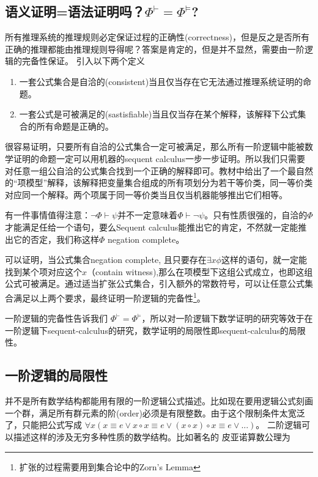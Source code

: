 \subsection{语义证明=语法证明吗？$\Phi^{\vdash}=\Phi^{\models}$?}
    所有推理系统的推理规则必定保证过程的正确性(correctness)，但是反之是否所有正确的推理都能由推理规则导得呢？答案是肯定的，但是并不显然，需要由一阶逻辑的完备性保证。
    引入以下两个定义
		\begin{enumerate}
			\item  一套公式集合是自洽的(consistent)当且仅当存在它无法通过推理系统证明的命题。
			\item  一套公式是可被满足的(sastisfiable)当且仅当存在某个解释，该解释下公式集合的所有命题是正确的。
		\end{enumerate}
    很容易证明，只要所有自洽的公式集合一定可被满足，那么所有一阶逻辑中能被数学证明的命题一定可以用机器的sequent calculus一步一步证明。所以我们只需要对任意一组公自洽的公式集合找到一个正确的解释即可。教材中给出了一个最自然的“项模型”解释，该解释把变量集合组成的所有项划分为若干等价类，同一等价类对应同一个解释。两个项属于同一等价类当且仅当机器能够推出它们相等。



		有一件事情值得注意：$\lnot \Phi \vdash \psi$并不一定意味着$\Phi \vdash \lnot \psi$。只有性质很强的，自洽的$\Phi$才能满足任给一个语句，要么Sequent calculus能推出它的肯定，不然就一定能推出它的否定，我们称这样$\Phi$ negation complete。

    可以证明，当公式集合negation complete, 且只要存在$\exists x \phi$这样的语句，就一定能找到某个项对应这个$x$（contain witness),那么在项模型下这组公式成立，也即这组公式可被满足。通过适当扩张公式集合，引入额外的常数符号，可以让任意公式集合满足以上两个要求，最终证明一阶逻辑的完备性\footnote{扩张的过程需要用到集合论中的Zorn's Lemma}。

    一阶逻辑的完备性告诉我们 $\Phi^{\vdash}=\Phi^{\models}$，所以对一阶逻辑下数学证明的研究等效于在一阶逻辑下sequent-calculus的研究，数学证明的局限性即sequent-calculus的局限性。


\subsection{一阶逻辑的局限性}
    并不是所有数学结构都能用有限的一阶逻辑公式描述。比如现在要用逻辑公式刻画一个群，满足所有群元素的阶(order)必须是有限整数。由于这个限制条件太宽泛了，只能把公式写成
		$\forall x(x \equiv e \vee x \circ x \equiv e \vee (x \circ x)\circ x \equiv e \vee ...)$。
		二阶逻辑可以描述这样的涉及无穷多种性质的数学结构。比如著名的
		皮亚诺算数公理为

